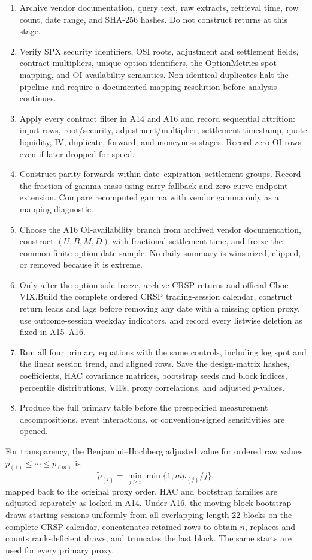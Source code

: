 \documentclass[11pt]{article}
\begin{document}
\begin{enumerate}
\item Archive vendor documentation, query text, raw extracts, retrieval time, row count,
date range, and SHA-256 hashes.  Do not construct returns at this stage.
\item Verify SPX security identifiers, OSI roots, adjustment and settlement fields,
contract multipliers, unique option identifiers, the OptionMetrics spot mapping, and OI
availability semantics.  Non-identical duplicates halt the pipeline and require a documented
mapping resolution before analysis continues.
\item Apply every contract filter in A14 and A16 and record sequential attrition: input rows,
root/security, adjustment/multiplier, settlement timestamp, quote liquidity, IV, duplicate,
forward, and moneyness stages.  Record zero-OI rows even if later dropped for speed.
\item Construct parity forwards within date--expiration--settlement groups.  Record the
fraction of gamma mass using carry fallback and zero-curve endpoint extension.  Compare
recomputed gamma with vendor gamma only as a mapping diagnostic.
\item Choose the A16 OI-availability branch from archived vendor documentation, construct
$(U,B,M,D)$ with fractional settlement time, and freeze the common finite option-date sample.
No daily summary is winsorized, clipped, or removed because it is extreme.
\item Only after the option-side freeze, archive CRSP returns and official Cboe VIX.\@ Build
the complete ordered CRSP trading-session calendar, construct return leads and lags before
removing any date with a missing option proxy, use outcome-session weekday indicators, and
record every listwise deletion as fixed in A15--A16.
\item Run all four primary equations with the same controls, including log spot and the
linear session trend, and aligned rows.  Save the
design-matrix hashes, coefficients, HAC covariance matrices, bootstrap seeds and block
indices, percentile distributions, VIFs, proxy correlations, and adjusted $p$-values.
\item Produce the full primary table before the prespecified measurement decompositions,
event interactions, or convention-signed sensitivities are opened.
\end{enumerate}

For transparency, the Benjamini--Hochberg adjusted value for ordered raw values
$p_{(1)}\leq\cdots\leq p_{(m)}$ is
\[
\widetilde p_{(i)}=\min_{j\geq i}\min\{1,mp_{(j)}/j\},
\]
mapped back to the original proxy order.  HAC and bootstrap families are adjusted
separately as locked in A14.  Under A16, the moving-block bootstrap draws starting sessions
uniformly from all overlapping length-22 blocks on the complete CRSP calendar, concatenates
retained rows to obtain $n$, replaces and counts rank-deficient draws, and truncates the last
block.  The same starts are used for every primary proxy.
\end{document}
